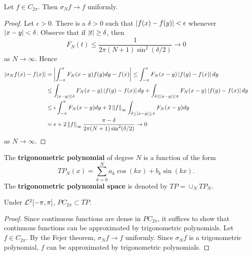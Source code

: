\begin{theorem}[Fejer]
    Let $f\in C_{2\pi}$. Then $\sigma_Nf \to f$ uniformly.
\end{theorem}
\begin{proof}
    Let $\epsilon>0$. There is a $\delta>0$ such that $\left\lvert {f(x)-f(y)} \right\rvert<\epsilon$ 
    whenever $\left\lvert {x-y} \right\rvert<\delta$. Observe that if $\left\lvert {t} \right\rvert\geq\delta$, then 
    \begin{equation*}
        F_N(t) \leq \frac{1}{2\pi(N+1)\sin^2(\delta/2)} \to 0
    \end{equation*}
    as $N\to\infty$. Hence 
    \begin{equation*}
        \begin{split}
            \left\lvert {\sigma_Nf(x) - f(x)} \right\rvert &= \left\lvert {\int_{-\pi}^\pi F_N(x-y)f(y)dy - f(x)} \right\rvert  
            \leq \int_{-\pi}^\pi F_N(x-y)\left\lvert {f(y)-f(x)} \right\rvert dy \\
            &\leq \int_{\left\lvert {x-y} \right\rvert\leq \delta} F_N(x-y)\left\lvert {f(y)-f(x)} \right\rvert dy + \int_{\delta\leq\left\lvert {x-y} \right\rvert\leq\pi} F_N(x-y)\left\lvert {f(y)-f(x)} \right\rvert dy \\
            &\leq \epsilon\int_{-\pi}^\pi F_N(x-y)dy + 2\left\lVert {f} \right\rVert_\infty\int_{\delta\leq\left\lvert {x-y} \right\rvert\leq\pi} F_N(x-y)dy \\
            &= \epsilon + 2\left\lVert {f} \right\rVert_\infty\frac{\pi-\delta}{2\pi(N+1)\sin^2(\delta/2)} \to 0
        \end{split}
    \end{equation*}
    as $N\to\infty$.
\end{proof}

\begin{definition}
    The \textbf{trigonometric polynomial} of degree $N$ is a function of the form 
    \begin{equation*}
        TP_N(x) = \sum_{k=0}^N a_k\cos(kx) + b_k\sin(kx). 
    \end{equation*}
    The \textbf{trigonometric polynomial space} is denoted by $TP = \cup_N TP_N$.
\end{definition}

\begin{theorem}
    Under $\mathcal{L}^2[-\pi,\pi]$, $PC_{2\pi}\subset\overline{TP}$.
\end{theorem}
\begin{proof}
    Since continuous functions are dense in $PC_{2\pi}$, it suffices to show 
    that continuous functions can be approximated by trigonometric polynomials.
    Let $f\in C_{2\pi}$. By the Fejer theorem, $\sigma_Nf \to f$ uniformly.
    Since $\sigma_Nf$ is a trigonometric polynomial, $f$ can be approximated
    by trigonometric polynomials. 
\end{proof}

